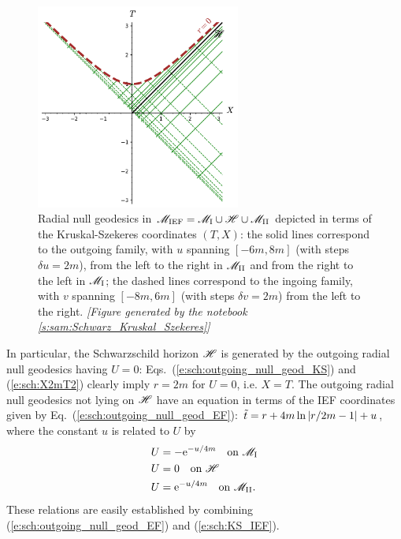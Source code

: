 \begin{figure}
\centerline{\includegraphics[width=0.6\textwidth]{max_rad_null_geod_KS.pdf}}
\caption[]{\label{f:sch:rad_null_geod_KS} \footnotesize
Radial null geodesics in $\mathscr{M}_{\rm IEF} = \mathscr{M}_{\rm I}\cup\mathscr{H}\cup\mathscr{M}_{\rm II}$
depicted in terms of the Kruskal-Szekeres coordinates $(T,X)$: the solid
lines correspond to the outgoing family, with $u$ spanning $[-6m, 8m]$
(with steps $\delta u = 2m$), from the left to the right in $\mathscr{M}_{\rm II}$
and from the right to the left in $\mathscr{M}_{\rm I}$; the dashed lines
correspond to the ingoing family, with $v$ spanning $[-8m, 6m]$ (with steps $\delta v = 2m$)
from the left to the right.
\textsl{[Figure generated by the notebook \ref{s:sam:Schwarz_Kruskal_Szekeres}]}
}
\end{figure}
In particular, the Schwarzschild horizon $\mathscr{H}$ is generated by the
outgoing radial null geodesics having $U=0$:
Eqs.~(\ref{e:sch:outgoing_null_geod_KS}) and (\ref{e:sch:X2mT2})
clearly imply $r=2m$ for $U=0$, i.e. $X=T$.
 The outgoing radial null geodesics not lying on $\mathscr{H}$ have an equation
in terms of the IEF coordinates given by
Eq.~(\ref{e:sch:outgoing_null_geod_EF}):
${\tilde t} = r + 4 m \ln \left|r/2m- 1 \right| + u$,
where the constant $u$ is related to $U$ by
\begin{subequations}
\begin{align}
 & U = - \mathrm{e}^{-u/4m} \quad \mbox{on}\ \mathscr{M}_{\rm I} \\
 & U = 0 \quad \mbox{on}\ \mathscr{H} \\
 & U =  \mathrm{e}^{-u/4m} \quad \mbox{on}\ \mathscr{M}_{\rm II} .
\end{align}
\end{subequations}
These relations are easily established by combining
(\ref{e:sch:outgoing_null_geod_EF}) and (\ref{e:sch:KS_IEF}).


